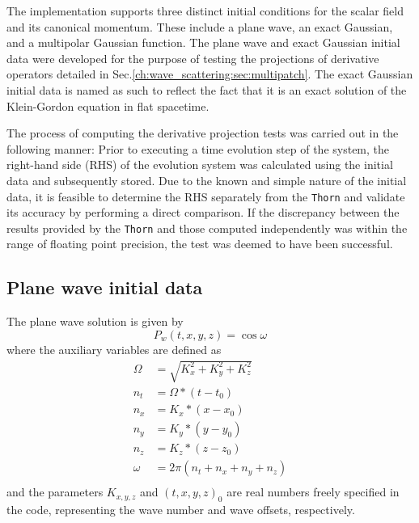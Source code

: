 The implementation supports three distinct initial conditions for the scalar field and its canonical momentum. These include a plane wave, an exact Gaussian, and a multipolar Gaussian function. The plane wave and exact Gaussian initial data were developed for the purpose of testing the projections of derivative operators detailed in Sec.\ref{ch:wave_scattering:sec:multipatch}. The exact Gaussian initial data is named as such to reflect the fact that it is an exact solution of the Klein-Gordon equation in flat spacetime.

The process of computing the derivative projection tests was carried out in the following manner: Prior to executing a time evolution step of the system, the right-hand side (RHS) of the evolution system was calculated using the initial data and subsequently stored. Due to the known and simple nature of the initial data, it is feasible to determine the RHS separately from the \texttt{Thorn} and validate its accuracy by performing a direct comparison. If the discrepancy between the results provided by the \texttt{Thorn} and those computed independently was within the range of floating point precision, the test was deemed to have been successful.

\subsection{Plane wave initial data}

The plane wave solution is given by
%
\begin{equation}
  P_w(t,x,y,z) = \cos\omega
\end{equation}
%
where the auxiliary variables are defined as
\begin{align}
  \Omega & = \sqrt{K_x^2 + K_y^2 + K_z^2}               \\
  n_t    & = \Omega * (t - t_0)                         \\
  n_x    & = K_x * (x - x_0)                            \\
  n_y    & = K_y * (y - y_0)                            \\
  n_z    & = K_z * (z - z_0)                            \\
  \omega & = 2 \pi \left( n_t + n_x + n_y + n_z \right) \\
\end{align}
%
and the parameters $K_{x,y,z}$ and $(t,x,y,z)_0$ are real numbers freely specified in the code, representing the wave number and wave offsets, respectively.

